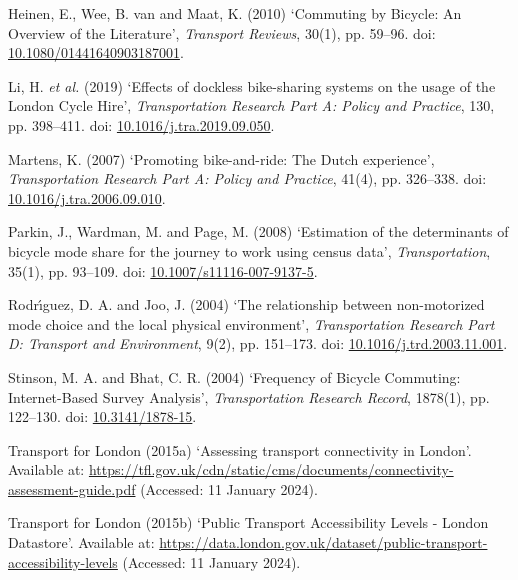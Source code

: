 \documentclass[
  12pt,
  a4paper,
  DIV=11,
  numbers=noendperiod]{scrartcl}
\newlength{\cslhangindent}
\newlength{\cslentryspacingunit} %
\newenvironment{CSLReferences}[2] %
 {%
  \setlength{\parindent}{0pt}
  \ifodd #1
  \let\oldpar\par
  \def\par{\hangindent=\cslhangindent\oldpar}
  \fi
  \setlength{\parskip}{#2\cslentryspacingunit}
 }%
 {}
\begin{document}
\begin{CSLReferences}{0}{0}
\leavevmode{}%
Heinen, E., Wee, B. van and Maat, K. (2010) {`Commuting by {Bicycle}:
{An} {Overview} of the {Literature}'}, \emph{Transport Reviews}, 30(1),
pp. 59--96. doi:
\href{https://doi.org/10.1080/01441640903187001}{10.1080/01441640903187001}.

\leavevmode{}%
Li, H. \emph{et al.} (2019) {`Effects of dockless bike-sharing systems
on the usage of the {London} {Cycle} {Hire}'}, \emph{Transportation
Research Part A: Policy and Practice}, 130, pp. 398--411. doi:
\href{https://doi.org/10.1016/j.tra.2019.09.050}{10.1016/j.tra.2019.09.050}.

\leavevmode{}%
Martens, K. (2007) {`Promoting bike-and-ride: {The} {Dutch}
experience'}, \emph{Transportation Research Part A: Policy and
Practice}, 41(4), pp. 326--338. doi:
\href{https://doi.org/10.1016/j.tra.2006.09.010}{10.1016/j.tra.2006.09.010}.

\leavevmode{}%
Parkin, J., Wardman, M. and Page, M. (2008) {`Estimation of the
determinants of bicycle mode share for the journey to work using census
data'}, \emph{Transportation}, 35(1), pp. 93--109. doi:
\href{https://doi.org/10.1007/s11116-007-9137-5}{10.1007/s11116-007-9137-5}.

\leavevmode{}%
Rodrı́guez, D. A. and Joo, J. (2004) {`The relationship between
non-motorized mode choice and the local physical environment'},
\emph{Transportation Research Part D: Transport and Environment}, 9(2),
pp. 151--173. doi:
\href{https://doi.org/10.1016/j.trd.2003.11.001}{10.1016/j.trd.2003.11.001}.

\leavevmode{}%
Stinson, M. A. and Bhat, C. R. (2004) {`Frequency of {Bicycle}
{Commuting}: {Internet}-{Based} {Survey} {Analysis}'},
\emph{Transportation Research Record}, 1878(1), pp. 122--130. doi:
\href{https://doi.org/10.3141/1878-15}{10.3141/1878-15}.

\leavevmode{}%
Transport for London (2015a) {`Assessing transport connectivity in
{London}'}. Available at:
\url{https://tfl.gov.uk/cdn/static/cms/documents/connectivity-assessment-guide.pdf}
(Accessed: 11 January 2024).

\leavevmode{}%
Transport for London (2015b) {`Public {Transport} {Accessibility}
{Levels} - {London} {Datastore}'}. Available at:
\url{https://data.london.gov.uk/dataset/public-transport-accessibility-levels}
(Accessed: 11 January 2024).


\end{CSLReferences}
\end{document}
